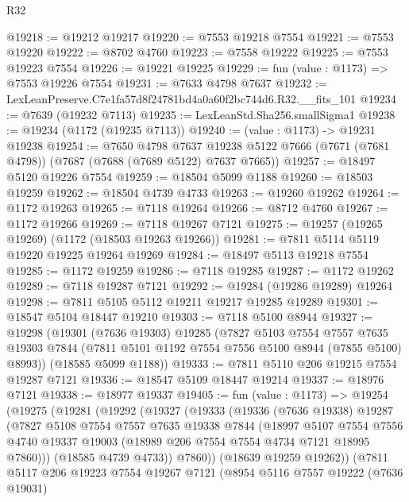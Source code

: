 \begin{lexlean}{R32}
\begin{coremodule}
@19218 := @19212 @19217
@19220 := @7553 @19218 @7554
@19221 := @7553 @19220
@19222 := @8702 @4760
@19223 := @7558 @19222
@19225 := @7553 @19223 @7554
@19226 := @19221 @19225
@19229 := fun (value : @1173) => @7553 @19226 @7554
@19231 := @7633 @4798 @7637
@19232 := LexLeanPreserve.C7e1fa57d8f24781bd4a0a60f2bc744d6.R32.__fits_101
@19234 := @7639 (@19232 @7113)
@19235 := LexLeanStd.Sha256.smallSigma1
@19238 := @19234 (@1172 (@19235 @7113))
@19240 := (value : @1173) -> @19231 @19238
@19254 := @7650
    @4798
    @7637
    @19238
    @5122
    @7666
    (@7671 (@7681 @4798))
    (@7687 (@7688 (@7689 @5122) @7637 @7665))
@19257 := @18497 @5120 @19226 @7554
@19259 := @18504 @5099 @1188
@19260 := @18503 @19259
@19262 := @18504 @4739 @4733
@19263 := @19260 @19262
@19264 := @1172 @19263
@19265 := @7118 @19264
@19266 := @8712 @4760
@19267 := @1172 @19266
@19269 := @7118 @19267 @7121
@19275 := @19257 (@19265 @19269) (@1172 (@18503 @19263 @19266))
@19281 := @7811 @5114 @5119 @19220 @19225 @19264 @19269
@19284 := @18497 @5113 @19218 @7554
@19285 := @1172 @19259
@19286 := @7118 @19285
@19287 := @1172 @19262
@19289 := @7118 @19287 @7121
@19292 := @19284 (@19286 @19289) @19264
@19298 := @7811 @5105 @5112 @19211 @19217 @19285 @19289
@19301 := @18547 @5104 @18447 @19210
@19303 := @7118 @5100 @8944
@19327 := @19298
    (@19301
      (@7636 @19303)
      @19285
      (@7827
        @5103
        @7554
        @7557
        @7635
        @19303
        @7844
        (@7811 @5101 @1192 @7554 @7556 @5100 @8944 (@7855 @5100) @8993))
      (@18585 @5099 @1188))
@19333 := @7811 @5110 @206 @19215 @7554 @19287 @7121
@19336 := @18547 @5109 @18447 @19214
@19337 := @18976 @7121
@19338 := @18977 @19337
@19405 := fun (value : @1173) =>
  @19254
    (@19275
      (@19281
        (@19292
          (@19327
            (@19333
              (@19336
                (@7636 @19338)
                @19287
                (@7827
                  @5108
                  @7554
                  @7557
                  @7635
                  @19338
                  @7844
                  (@18997
                    @5107
                    @7554
                    @7556
                    @4740
                    @19337
                    @19003
                    (@18989 @206 @7554 @7554 @4734 @7121 @18995 @7860)))
                (@18585 @4739 @4733))
              @7860))
          (@18639 @19259 @19262))
        (@7811
          @5117
          @206
          @19223
          @7554
          @19267
          @7121
          (@8954
            @5116
            @7557
            @19222
            (@7636 @19031)

\end{coremodule}
\end{lexlean}
